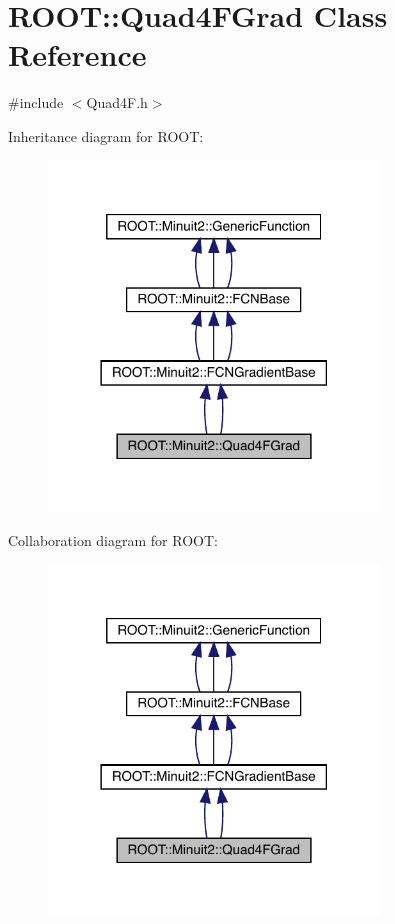 \hypertarget{classROOT_1_1Minuit2_1_1Quad4FGrad}{}\section{R\+O\+OT\+:\+:Quad4\+F\+Grad Class Reference}
\label{classROOT_1_1Minuit2_1_1Quad4FGrad}


{\ttfamily \#include $<$Quad4\+F.\+h$>$}



Inheritance diagram for R\+O\+OT\+:
\nopagebreak
\begin{figure}[H]
\begin{center}
\leavevmode
\includegraphics[width=249pt]{d5/d99/classROOT_1_1Minuit2_1_1Quad4FGrad__inherit__graph}
\end{center}
\end{figure}


Collaboration diagram for R\+O\+OT\+:
\nopagebreak
\begin{figure}[H]
\begin{center}
\leavevmode
\includegraphics[width=249pt]{dd/d3b/classROOT_1_1Minuit2_1_1Quad4FGrad__coll__graph}
\end{center}
\end{figure}
